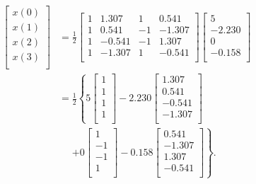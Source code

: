 \documentclass{article}
\begin{document}
\begin{align*}
    \left[
    \begin{array}{l}
            x(0) \\ x(1) \\ x(2) \\ x(3)
    \\ \end{array}
    \right]
    &=
    \frac{1}{2}
    \left[ \begin{array}{cccc}
     1 &  1.307 & 1 & 0.541 \\
     1 &  0.541 & -1 & -1.307 \\
     1 &  -0.541 & -1 & 1.307 \\
     1 &  -1.307 & 1 & -0.541 \\ \end{array} \right]
    \left[
    \begin{array}{c}
            5 \\ -2.230 \\ 0 \\ -0.158
    \\ \end{array}
    \right]
    \\
    &=
    \frac{1}{2} \left\{
    5
    \left[
    \begin{array}{c}
            1 \\ 1 \\ 1 \\ 1
    \\ \end{array}
    \right]
    - 2.230
    \left[
    \begin{array}{c}
            1.307 \\ 0.541 \\ -0.541  \\ -1.307
    \\ \end{array}
    \right] \right.\\
    &\mathrel{\phantom{=}} \left. +0    \left[
    \begin{array}{c}
            1 \\ -1 \\ -1 \\ 1
    \\ \end{array}
    \right]
    -0.158
    \left[
    \begin{array}{c}
            0.541 \\ -1.307 \\ 1.307 \\ -0.541
    \\ \end{array}
    \right]
    \right\}.
\end{align*}
\end{document}

